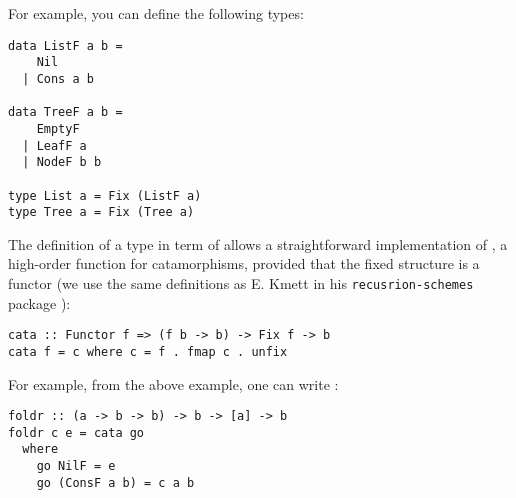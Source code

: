 For example, you can define the following types:
\begin{verbatim}
data ListF a b =
    Nil
  | Cons a b

data TreeF a b =
    EmptyF
  | LeafF a
  | NodeF b b

type List a = Fix (ListF a)
type Tree a = Fix (Tree a)
\end{verbatim}

The definition of a type in term of  allows a straightforward implementation of , a high-order function for catamorphisms, provided that the fixed structure is a functor (we use the same definitions as E. Kmett in his \verb|recusrion-schemes| package \cite{ekmett:eschems}):
\begin{verbatim}
cata :: Functor f => (f b -> b) -> Fix f -> b
cata f = c where c = f . fmap c . unfix
\end{verbatim}

For example,  from the above example, one can write :
\begin{verbatim}
foldr :: (a -> b -> b) -> b -> [a] -> b
foldr c e = cata go
  where
    go NilF = e
    go (ConsF a b) = c a b
\end{verbatim}